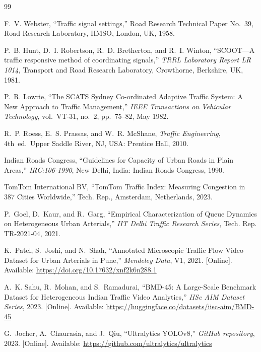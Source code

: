 \documentclass[12pt,a4paper,oneside]{report}
\begin{document}
\begin{small}
\begin{thebibliography}{99}
\setlength{\itemsep}{0.25em}
\setlength{\parskip}{0pt}

F.~V. Webster, ``Traffic signal settings,'' Road Research Technical Paper No.~39, Road Research Laboratory, HMSO, London, UK, 1958.

P.~B. Hunt, D.~I. Robertson, R.~D. Bretherton, and R.~I. Winton, ``SCOOT---A traffic responsive method of coordinating signals,'' \emph{TRRL Laboratory Report LR 1014}, Transport and Road Research Laboratory, Crowthorne, Berkshire, UK, 1981.

P.~R. Lowrie, ``The SCATS Sydney Co-ordinated Adaptive Traffic System: A New Approach to Traffic Management,'' \emph{IEEE Transactions on Vehicular Technology}, vol.~VT-31, no.~2, pp.~75--82, May 1982.

R.~P. Roess, E.~S. Prassas, and W.~R. McShane, \emph{Traffic Engineering}, 4th~ed.\ Upper Saddle River, NJ, USA: Prentice Hall, 2010.

Indian Roads Congress, ``Guidelines for Capacity of Urban Roads in Plain Areas,'' \emph{IRC:106-1990}, New Delhi, India: Indian Roads Congress, 1990.

TomTom International BV, ``TomTom Traffic Index: Measuring Congestion in 387 Cities Worldwide,'' Tech. Rep., Amsterdam, Netherlands, 2023.

P.~Goel, D.~Kaur, and R.~Garg, ``Empirical Characterization of Queue Dynamics on Heterogeneous Urban Arterials,'' \emph{IIT Delhi Traffic Research Series}, Tech. Rep. TR-2021-04, 2021.

K.~Patel, S.~Joshi, and N.~Shah, ``Annotated Microscopic Traffic Flow Video Dataset for Urban Arterials in Pune,'' \emph{Mendeley Data}, V1, 2021. [Online]. Available: \url{https://doi.org/10.17632/xnf2k6n288.1}

A.~K. Sahu, R.~Mohan, and S.~Ramadurai, ``BMD-45: A Large-Scale Benchmark Dataset for Heterogeneous Indian Traffic Video Analytics,'' \emph{IISc AIM Dataset Series}, 2023. [Online]. Available: \url{https://huggingface.co/datasets/iisc-aim/BMD-45}

G.~Jocher, A.~Chaurasia, and J.~Qiu, ``Ultralytics YOLOv8,'' \emph{GitHub repository}, 2023. [Online]. Available: \url{https://github.com/ultralytics/ultralytics}


\end{thebibliography}
\end{small}
\end{document}
